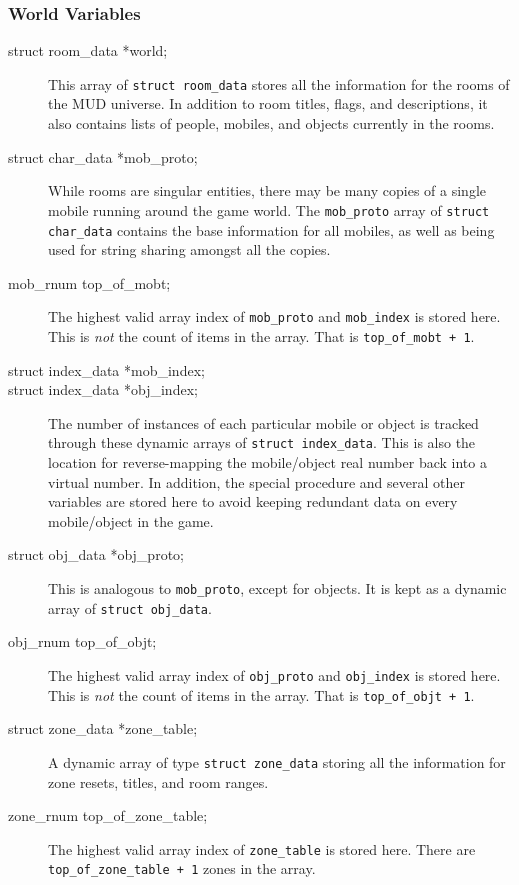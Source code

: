 \documentclass[11pt]{article}
\begin{document}
\subsubsection{World Variables}
\begin{description}
\item[struct room\_data *world;]
This array of \texttt{struct room\_data} stores all the information for the rooms of the MUD universe.  In addition to room titles, flags, and descriptions, it also contains lists of people, mobiles, and objects currently in the rooms.
\item[struct char\_data *mob\_proto;]
While rooms are singular entities, there may be many copies of a single mobile running around the game world.  The \texttt{mob\_proto} array of \texttt{struct char\_data} contains the base information for all mobiles, as well as being used for string sharing amongst all the copies.
\item[mob\_rnum top\_of\_mobt;]
The highest valid array index of \texttt{mob\_proto} and \texttt{mob\_index} is stored here.  This is {\em not} the count of items in the array. That is \texttt{top\_of\_mobt + 1}.
\item[struct index\_data *mob\_index;]
\item[struct index\_data *obj\_index;]
The number of instances of each particular mobile or object is tracked through these dynamic arrays of \texttt{struct index\_data}.  This is also the location for reverse-mapping the mobile/object real number back into a virtual number.  In addition, the special procedure and several other variables are stored here to avoid keeping redundant data on every mobile/object in the game.
\item[struct obj\_data *obj\_proto;]
This is analogous to \texttt{mob\_proto}, except for objects.  It is kept as a dynamic array of \texttt{struct obj\_data}.
\item[obj\_rnum top\_of\_objt;]
The highest valid array index of \texttt{obj\_proto} and \texttt{obj\_index} is stored
here.  This is {\em not} the count of items in the array. That is \texttt{top\_of\_objt + 1}.
\item[struct zone\_data *zone\_table;]
A dynamic array of type \texttt{struct zone\_data} storing all the information for zone resets, titles, and room ranges.
\item[zone\_rnum top\_of\_zone\_table;]
The highest valid array index of \texttt{zone\_table} is stored here.  There are \texttt{top\_of\_zone\_table + 1} zones in the array.
\end{description}
\end{document}
